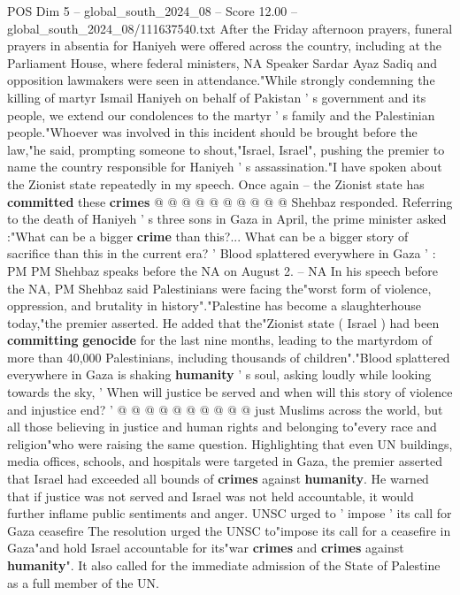 \begin{textsample}{POS Dim 5 – global\_south\_2024\_08 – Score 12.00 – global\_south\_2024\_08/111637540.txt}
After the Friday afternoon prayers, funeral prayers in absentia for Haniyeh were offered across the country, including at the Parliament House, where federal ministers, NA Speaker Sardar Ayaz Sadiq and opposition lawmakers were seen in attendance."While strongly condemning the killing of martyr Ismail Haniyeh on behalf of Pakistan ' s government and its people, we extend our condolences to the martyr ' s family and the Palestinian people."Whoever was involved in this incident should be brought before the law,"he said, prompting someone to shout,"Israel, Israel", pushing the premier to name the country responsible for Haniyeh ' s assassination."I have spoken about the Zionist state repeatedly in my speech.
Once again -- the Zionist state has \textbf{committed} these \textbf{crimes} @ @ @ @ @ @ @ @ @ @ Shehbaz responded.
Referring to the death of Haniyeh ' s three sons in Gaza in April, the prime minister asked :"What can be a bigger \textbf{crime} than this?...
What can be a bigger story of sacrifice than this in the current era? ' Blood splattered everywhere in Gaza ' : PM PM Shehbaz speaks before the NA on August 2. -- NA In his speech before the NA, PM Shehbaz said Palestinians were facing the"worst form of violence, oppression, and brutality in history"."Palestine has become a slaughterhouse today,"the premier asserted.
He added that the"Zionist state ( Israel ) had been \textbf{committing} \textbf{genocide} for the last nine months, leading to the martyrdom of more than 40,000 Palestinians, including thousands of children"."Blood splattered everywhere in Gaza is shaking \textbf{humanity} ' s soul, asking loudly while looking towards the sky, ' When will justice be served and when will this story of violence and injustice end? ' @ @ @ @ @ @ @ @ @ @ just Muslims across the world, but all those believing in justice and human rights and belonging to"every race and religion"who were raising the same question.
Highlighting that even UN buildings, media offices, schools, and hospitals were targeted in Gaza, the premier asserted that Israel had exceeded all bounds of \textbf{crimes} against \textbf{humanity}.
He warned that if justice was not served and Israel was not held accountable, it would further inflame public sentiments and anger.
UNSC urged to ' impose ' its call for Gaza ceasefire The resolution urged the UNSC to"impose its call for a ceasefire in Gaza"and hold Israel accountable for its"war \textbf{crimes} and \textbf{crimes} against \textbf{humanity}".
It also called for the immediate admission of the State of Palestine as a full member of the UN.

\end{textsample}
